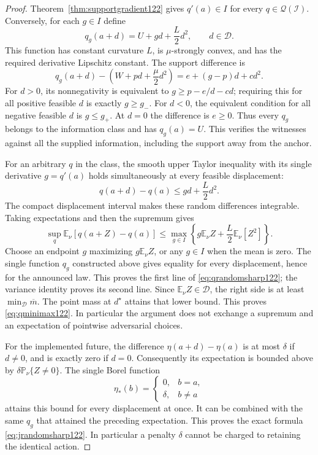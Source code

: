 \begin{proof}
Theorem~\ref{thm:supportgradient122} gives $q'(a)\in I$ for every
$q\in\mathcal Q(\mathcal I)$. Conversely, for each $g\in I$ define
\[
 q_g(a+d)=U+gd+\frac L2d^2,\qquad d\in\mathcal D.
\]
This function has constant curvature $L$, is $\mu$-strongly convex, and
has the required derivative Lipschitz constant. The support difference is
\[
 q_g(a+d)-\left(W+pd+\frac\mu2d^2\right)
       =e+(g-p)d+cd^2.
\]
For $d>0$, its nonnegativity is equivalent to
$g\ge p-e/d-cd$; requiring this for all positive feasible $d$ is exactly
$g\ge g_-$. For $d<0$, the equivalent condition for all negative
feasible $d$ is $g\le g_+$. At $d=0$ the difference is $e\ge0$.
Thus every $q_g$ belongs to the information class and has $q_g(a)=U$.
This verifies the witnesses against all the supplied information,
including the support away from the anchor.

For an arbitrary $q$ in the class, the smooth upper Taylor inequality
with its single derivative $g=q'(a)$ holds simultaneously at every
feasible displacement:
\[
 q(a+d)-q(a)\le gd+\frac L2d^2.
\]
The compact displacement interval makes these random differences
integrable. Taking expectations and then the supremum gives
\[
 \sup_q\mathbb E_\nu[q(a+Z)-q(a)]
 \le\max_{g\in I}\left\{g\mathbb E_\nu Z
                    +\frac L2\mathbb E_\nu[Z^2]\right\}.
\]
Choose an endpoint $g$ maximizing $g\mathbb E_\nu Z$, or any $g\in I$
when the mean is zero. The single function $q_g$ constructed above gives
equality for every displacement, hence for the announced law. This
proves the first line of \eqref{eq:qrandomsharp122}; the variance
identity proves its second line. Since $\mathbb E_\nu Z\in\mathcal D$,
the right side is at least $\min_{\mathcal D}\overline m$. The point
mass at $d^\star$ attains that lower bound. This proves
\eqref{eq:qminimax122}. In particular the argument does not exchange a
supremum and an expectation of pointwise adversarial choices.

For the implemented future, the difference
$\eta(a+d)-\eta(a)$ is at most $\delta$ if $d\ne0$, and is exactly zero
if $d=0$. Consequently its expectation is bounded above by
$\delta\mathbb P_\nu\{Z\ne0\}$. The single Borel function
\[
 \eta_*(b)=
 \begin{cases}
  0,& b=a,\\
  \delta,& b\ne a
 \end{cases}
\]
attains this bound for every displacement at once. It can be combined
with the same $q_g$ that attained the preceding expectation. This proves
the exact formula \eqref{eq:jrandomsharp122}. In particular a penalty
$\delta$ cannot be charged to retaining the identical action.


\end{proof}
